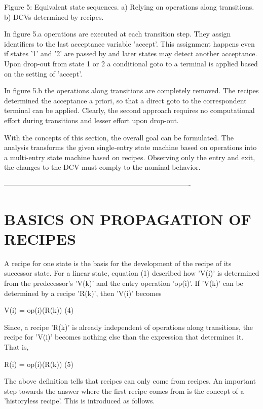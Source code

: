 \documentclass[12pt]{article}
\begin{document}
     Figure 5: Equivalent state sequences. a) Relying on operations along
               transitions. b) DCVs determined by recipes.

In figure 5.a operations are executed at each transition step. They assign
identifiers to the last acceptance variable 'accept'. This assignment happens
even if states '1' and '2' are passed by and later states may detect another
acceptance. Upon drop-out from state 1 or 2 a conditional goto to a terminal is
applied based on the setting of 'accept'. 

In figure 5.b the operations along transitions are completely removed. The
recipes determined the acceptance a priori, so that a direct goto to the
correspondent terminal can be applied.  Clearly, the second approach requires
no computational effort during transitions and lesser effort upon drop-out.

With the concepts of this section, the overall goal can be formulated. The
analysis transforms the given single-entry state machine based on operations
into a multi-entry state machine based on recipes. Observing only the entry and
exit, the changes to the DCV must comply to the nominal behavior. 

-------------------------------------------------------------------------------

\section{BASICS ON PROPAGATION OF RECIPES}

A recipe for one state is the basis for the development of the recipe of its
successor state. For a linear state, equation (1) described how 'V(i)' is
determined from the predecessor's 'V(k)' and the entry operation 'op(i)'. If
'V(k)' can be determined by a recipe 'R(k)', then 'V(i)' becomes

                     V(i) = op(i)(R(k))                                     (4)

Since, a recipe 'R(k)' is already independent of operations along transitions,
the recipe for 'V(i)' becomes nothing else than the expression that
determines it. That is,

                     R(i) = { op(i)(R(k)) }                                 (5)
                 
The above definition tells that recipes can only come from recipes. An
important step towards the answer where the first recipe comes from is the
concept of a 'historyless recipe'. This is introduced as follows. 
\end{document}
